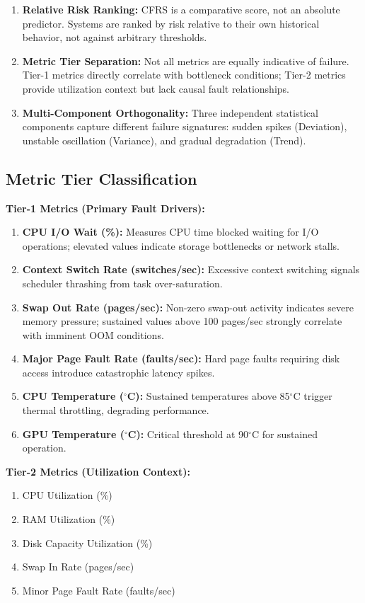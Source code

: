 \documentclass{ieeeaccess}
\begin{document}
\begin{enumerate}
    \item \textbf{Relative Risk Ranking:} CFRS is a comparative score, not an absolute predictor. Systems are ranked by risk relative to their own historical behavior, not against arbitrary thresholds.
    \item \textbf{Metric Tier Separation:} Not all metrics are equally indicative of failure. Tier-1 metrics directly correlate with bottleneck conditions; Tier-2 metrics provide utilization context but lack causal fault relationships.
    \item \textbf{Multi-Component Orthogonality:} Three independent statistical components capture different failure signatures: sudden spikes (Deviation), unstable oscillation (Variance), and gradual degradation (Trend).
\end{enumerate}

\subsection{Metric Tier Classification}
\textbf{Tier-1 Metrics (Primary Fault Drivers):}
\begin{enumerate}
    \item \textbf{CPU I/O Wait (\%):} Measures CPU time blocked waiting for I/O operations; elevated values indicate storage bottlenecks or network stalls.
    \item \textbf{Context Switch Rate (switches/sec):} Excessive context switching signals scheduler thrashing from task over-saturation.
    \item \textbf{Swap Out Rate (pages/sec):} Non-zero swap-out activity indicates severe memory pressure; sustained values above 100 pages/sec strongly correlate with imminent OOM conditions.
    \item \textbf{Major Page Fault Rate (faults/sec):} Hard page faults requiring disk access introduce catastrophic latency spikes.
    \item \textbf{CPU Temperature ($^\circ$C):} Sustained temperatures above 85$^\circ$C trigger thermal throttling, degrading performance.
    \item \textbf{GPU Temperature ($^\circ$C):} Critical threshold at 90$^\circ$C for sustained operation.
\end{enumerate}

\textbf{Tier-2 Metrics (Utilization Context):}
\begin{enumerate}
    \item CPU Utilization (\%)
    \item RAM Utilization (\%)
    \item Disk Capacity Utilization (\%)
    \item Swap In Rate (pages/sec)
    \item Minor Page Fault Rate (faults/sec)
\end{enumerate}
\end{document}
